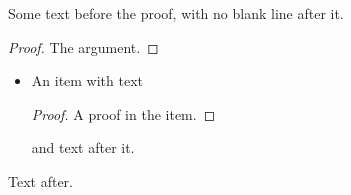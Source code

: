 \documentclass{article}
\begin{document}
Some text before the proof, with no blank line after it.
\begin{proof}
The argument.
\end{proof}
\begin{itemize}
\item An item with text
\begin{proof}
A proof in the item.
\end{proof}
and text after it.
\end{itemize}
Text after.
\end{document}
